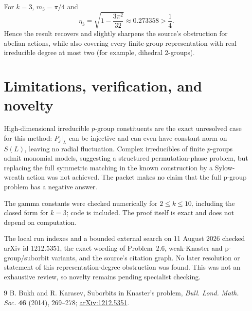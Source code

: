 \documentclass[11pt]{article}
\begin{document}
For $k=3$, $m_3=\pi/4$ and
\[
 \eta_3=\sqrt{1-\frac{3\pi^2}{32}}\approx0.273358>\frac14.
\]
Hence the result recovers and slightly sharpens the source's obstruction for
abelian actions, while also covering every finite-group representation with
real irreducible degree at most two (for example, dihedral $2$-groups).

\section{Limitations, verification, and novelty}

High-dimensional irreducible $p$-group constituents are the exact unresolved
case for this method: $P_j|_L$ can be injective and can even have constant norm
on $S(L)$, leaving no radial fluctuation.  Complex irreducibles of finite
$p$-groups admit monomial models, suggesting a structured permutation-phase
problem, but replacing the full symmetric matching in the known construction
by a Sylow-wreath action was not achieved.  The packet makes no claim that the
full p-group problem has a negative answer.

The gamma constants were checked numerically for $2\le k\le10$, including the
closed form for $k=3$; code is included.  The proof itself is exact and does
not depend on computation.

The local run indexes and a bounded external search on 11 August 2026 checked
arXiv id 1212.5351, the exact wording of Problem~2.6, weak-Knaster and
p-group/suborbit variants, and the source's citation graph.  No later
resolution or statement of this representation-degree obstruction was found.
This was not an exhaustive review, so novelty remains pending specialist
checking.

\begin{thebibliography}{9}
B. Bukh and R. Karasev,
\newblock Suborbits in Knaster's problem,
\newblock \emph{Bull. Lond. Math. Soc.} \textbf{46} (2014), 269--278;
\href{https://arxiv.org/abs/1212.5351}{arXiv:1212.5351}.
\end{thebibliography}
\end{document}
